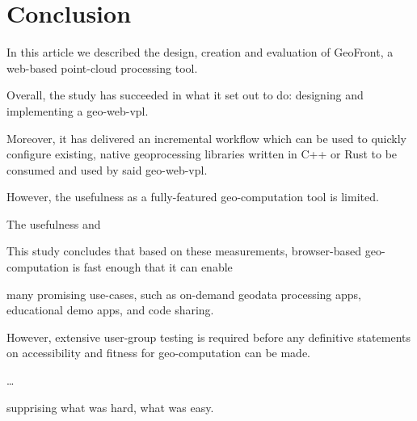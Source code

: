 \chapter{Conclusion}
\label{chap:conclusion}
In this article we described the design, creation and evaluation of GeoFront, a web-based point-cloud processing tool.

Overall, the study has succeeded in what it set out to do: designing and implementing a geo-web-vpl. 

Moreover, it has delivered an incremental workflow which can be used to quickly configure existing, native geoprocessing libraries written in C++ or Rust to be consumed and used by said geo-web-vpl.  

However, the usefulness as a fully-featured geo-computation tool is limited. 

The usefulness and 

This study concludes that based on these measurements, browser-based geo-computation  is fast enough that it can enable 

many promising use-cases, such as on-demand geodata processing apps, educational demo apps, and code sharing. 

However, extensive user-group testing is required before any definitive statements on accessibility and fitness for geo-computation can be made.  




\dots

supprising what was hard, what was easy. 






